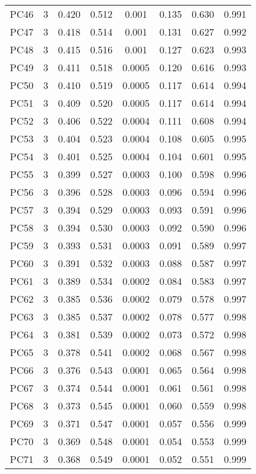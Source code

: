 \begin{table}[!htbp]
\begin{tabular}{@{\extracolsep{5pt}}lccccccc}
PC46 & 3 & 0.420 & 0.512 & 0.001 & 0.135 & 0.630 & 0.991 \\ 
PC47 & 3 & 0.418 & 0.514 & 0.001 & 0.131 & 0.627 & 0.992 \\ 
PC48 & 3 & 0.415 & 0.516 & 0.001 & 0.127 & 0.623 & 0.993 \\ 
PC49 & 3 & 0.411 & 0.518 & 0.0005 & 0.120 & 0.616 & 0.993 \\ 
PC50 & 3 & 0.410 & 0.519 & 0.0005 & 0.117 & 0.614 & 0.994 \\ 
PC51 & 3 & 0.409 & 0.520 & 0.0005 & 0.117 & 0.614 & 0.994 \\ 
PC52 & 3 & 0.406 & 0.522 & 0.0004 & 0.111 & 0.608 & 0.994 \\ 
PC53 & 3 & 0.404 & 0.523 & 0.0004 & 0.108 & 0.605 & 0.995 \\ 
PC54 & 3 & 0.401 & 0.525 & 0.0004 & 0.104 & 0.601 & 0.995 \\ 
PC55 & 3 & 0.399 & 0.527 & 0.0003 & 0.100 & 0.598 & 0.996 \\ 
PC56 & 3 & 0.396 & 0.528 & 0.0003 & 0.096 & 0.594 & 0.996 \\ 
PC57 & 3 & 0.394 & 0.529 & 0.0003 & 0.093 & 0.591 & 0.996 \\ 
PC58 & 3 & 0.394 & 0.530 & 0.0003 & 0.092 & 0.590 & 0.996 \\ 
PC59 & 3 & 0.393 & 0.531 & 0.0003 & 0.091 & 0.589 & 0.997 \\ 
PC60 & 3 & 0.391 & 0.532 & 0.0003 & 0.088 & 0.587 & 0.997 \\ 
PC61 & 3 & 0.389 & 0.534 & 0.0002 & 0.084 & 0.583 & 0.997 \\ 
PC62 & 3 & 0.385 & 0.536 & 0.0002 & 0.079 & 0.578 & 0.997 \\ 
PC63 & 3 & 0.385 & 0.537 & 0.0002 & 0.078 & 0.577 & 0.998 \\ 
PC64 & 3 & 0.381 & 0.539 & 0.0002 & 0.073 & 0.572 & 0.998 \\ 
PC65 & 3 & 0.378 & 0.541 & 0.0002 & 0.068 & 0.567 & 0.998 \\ 
PC66 & 3 & 0.376 & 0.543 & 0.0001 & 0.065 & 0.564 & 0.998 \\ 
PC67 & 3 & 0.374 & 0.544 & 0.0001 & 0.061 & 0.561 & 0.998 \\ 
PC68 & 3 & 0.373 & 0.545 & 0.0001 & 0.060 & 0.559 & 0.998 \\ 
PC69 & 3 & 0.371 & 0.547 & 0.0001 & 0.057 & 0.556 & 0.999 \\ 
PC70 & 3 & 0.369 & 0.548 & 0.0001 & 0.054 & 0.553 & 0.999 \\ 
PC71 & 3 & 0.368 & 0.549 & 0.0001 & 0.052 & 0.551 & 0.999 \\ 

\end{tabular}
\end{table}

